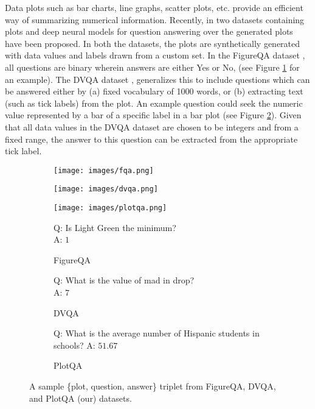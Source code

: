 \documentclass[10pt,twocolumn,letterpaper]{article}
\begin{document}
Data plots such as bar charts, line graphs, scatter plots, etc. provide an efficient way of summarizing numerical information. 
Recently, in \cite{FQA, DVQA} two datasets containing plots and deep neural models for question answering over the generated plots have been proposed. In both the datasets, the plots are synthetically generated with data values and labels drawn from a custom set. In the FigureQA dataset \cite{FQA}, all questions are binary wherein answers are either Yes or No, (see Figure \ref{fig:sample_plots_fqa} for an example).  The DVQA dataset \cite{DVQA}, generalizes this to include questions which can be answered either by (a) fixed vocabulary of 1000 words, or (b) extracting text (such as tick labels) from the plot.  An example question could seek the numeric value represented by a bar of a specific label in a bar plot (see Figure \ref{fig:sample_plots_dvqa}).  Given that all data values in the DVQA dataset are chosen to be integers and from a fixed range, the answer to this question can be extracted from the appropriate tick label. 

\begin{figure*}
\centering
\begin{subfigure}[t]{.32\textwidth}
  \centering
  \texttt{[image: images/fqa.png]}
\end{subfigure}\begin{subfigure}[t]{.32\textwidth}
  \centering
  \texttt{[image: images/dvqa.png]}
\end{subfigure}
\begin{subfigure}[t]{.32\textwidth}
  \centering
  \texttt{[image: images/plotqa.png]}
\end{subfigure}
\begin{subfigure}[t]{.3\textwidth}
  \noindent
  \footnotesize
  Q: Is Light Green the minimum?\\
  A: $1$
  \caption{FigureQA}
  \label{fig:sample_plots_fqa}
\end{subfigure}
\begin{subfigure}[t]{.3\textwidth}
  \noindent 
  \footnotesize
  Q: What is the value of mad in drop?\\
  A: $7$
  \caption{DVQA}
  \label{fig:sample_plots_dvqa}
\end{subfigure}
\begin{subfigure}[t]{.3\textwidth}
  \noindent
  \footnotesize
  Q: What is the average number of Hispanic students in schools?
  A: $51.67$
  \caption{PlotQA}
  \label{fig:sample_plots_PlotQA}
\end{subfigure}
\caption{
A sample \{plot, question, answer\} triplet from FigureQA, DVQA, and PlotQA (our) datasets.
}
\label{fig:sample_plots}
\end{figure*}
\end{document}
